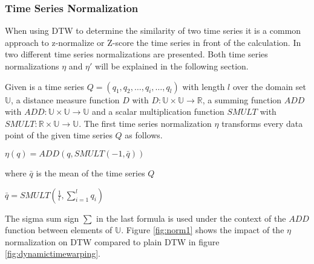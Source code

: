 \subsubsection{Time Series Normalization} \label{time_series_normalization}
When using DTW to determine the similarity of two time series it is a common approach to z-normalize or Z-score the time
series in front of the calculation. In \cite{das1998rule} two different time series normalizations are presented. Both
time series normalizations $\eta$ and $\eta '$ will be explained in the following section.

Given is a time series $Q = (q_1, q_2, \dots, q_i, \dots, q_l)$ with length $l$ over the domain set $\mathbb{U}$, a
distance measure function $D$ with $D: \mathbb{U} \times \mathbb{U} \to \mathbb{R}$, a summing function $ADD$ with
$ADD: \mathbb{U} \times \mathbb{U} \to \mathbb{U}$ and a scalar multiplication function $SMULT$ with
$SMULT: \mathbb{R} \times \mathbb{U} \to \mathbb{U}$. The first time series normalization $\eta$ transforms every data
point of the given time series $Q$ as follows.
\begin{center}
    $\eta (q) = ADD(q, SMULT(-1, \bar{q}))$
\end{center}
where $\bar{q}$ is the mean of the time series $Q$
\begin{center}
    $\bar{q} = SMULT(\frac{1}{l}, \sum \limits_{i=1}^{l} q_i)$
\end{center}
The sigma sum sign $\sum$ in the last formula is used under the context of the $ADD$ function between elements of
$\mathbb{U}$. Figure \ref{fig:norm1} shows the impact of the $\eta$ normalization on DTW compared to plain DTW in figure
\ref{fig:dynamictimewarping}.

